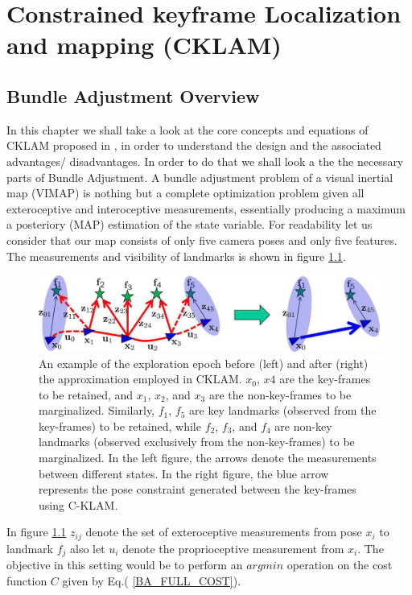\chapter{Constrained keyframe Localization and mapping (CKLAM)}
\label{sec:CKLAM}
\section{Bundle Adjustment Overview}
In this chapter we shall take a look at the core concepts and equations of CKLAM proposed in \cite{CKLAM}, in order to understand the design and the associated advantages/ disadvantages. In order to do that we shall look a the the necessary parts of Bundle Adjustment. 
A bundle adjustment problem of a visual inertial map (VIMAP) is nothing but a complete optimization problem given all exteroceptive and interoceptive measurements, essentially producing a maximum a posteriory (MAP) estimation of the state variable. For readability let us consider that our map consists of only five camera poses and only five features. The measurements and visibility of landmarks is shown in figure \ref{fig:CKLAM_BLOCK}. 

\begin{figure}[ht]
	\centering
		\includegraphics[width=1.00\textwidth]{images/cklam_block.png}
		\caption{An example of the exploration epoch before (left) and after (right) the approximation employed in CKLAM. $x_0$, $x4$ are the key-frames to be retained, and $x_1$, $x_2$, and $x_3$ are the non-key-frames to be marginalized. Similarly, $f_1$, $f_5$ are key landmarks (observed from the key-frames) to be retained, while $f_2$, $f_3$, and $f_4$ are non-key landmarks (observed exclusively from the non-key-frames) to be marginalized. In the left figure, the arrows denote the measurements between different states. In the right figure, the blue arrow represents the pose constraint generated between the key-frames using C-KLAM. \cite{CKLAM} }
	\label{fig:CKLAM_BLOCK}
\end{figure}

In figure \ref{fig:CKLAM_BLOCK} $z_{ij}$ denote the set of exteroceptive measurements from pose $x_i$ to landmark $f_j$ also let $u_i$ denote the proprioceptive measurement from $x_i$. The objective in this setting would be to perform an $argmin$ operation on the cost function $C$ given by Eq.( \ref{BA_FULL_COST}). 

